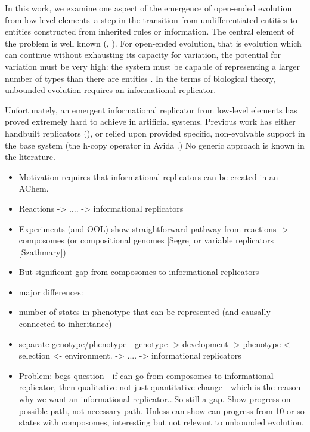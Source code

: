 In this work, we examine one aspect of the emergence of open-ended evolution from low-level elements--a step in the transition from undifferentiated entities to entities constructed from inherited rules or information. The central element of the problem is well known (\eg, \textcite{Maynard-Smith:1995lw, Szathmary2000}). For open-ended evolution, that is evolution which can continue without exhausting its capacity for variation, the potential for variation must be very high: the system must be capable of representing a larger number of types than there are entities \parencite{Szathmary1999}. In the terms of biological theory, unbounded evolution requires an informational replicator.

Unfortunately, an emergent informational replicator from low-level elements has proved extremely hard to achieve in artificial systems. Previous work has either handbuilt replicators (\eg \cite{Hutton2003}), or relied upon provided specific, non-evolvable support in the base system (\eg the h-copy operator in Avida \parencite{Ofria2004}.) No generic approach is known in the literature.

\begin{itemize}
\item Motivation requires that informational replicators can be created in an AChem.
\item Reactions -> .... -> informational replicators
\item Experiments (and OOL) show straightforward pathway from reactions -> composomes (or compositional genomes [Segre] or variable replicators [Szathmary])
\item But significant gap from composomes to informational replicators
\item major differences:
\item number of states in phenotype that can be represented (and causally connected to inheritance)
\item separate genotype/phenotype - genotype -> development -> phenotype <- selection <- environment. -> .... -> informational replicators
\item Problem: begs question - if can go from composomes to informational replicator, then qualitative not just quantitative change - which is the reason why we want an informational replicator...So still a gap. Show progress on possible path, not necessary path. Unless can show can progress from 10 or so states with composomes, interesting but not relevant to unbounded evolution. 
\end{itemize} 




